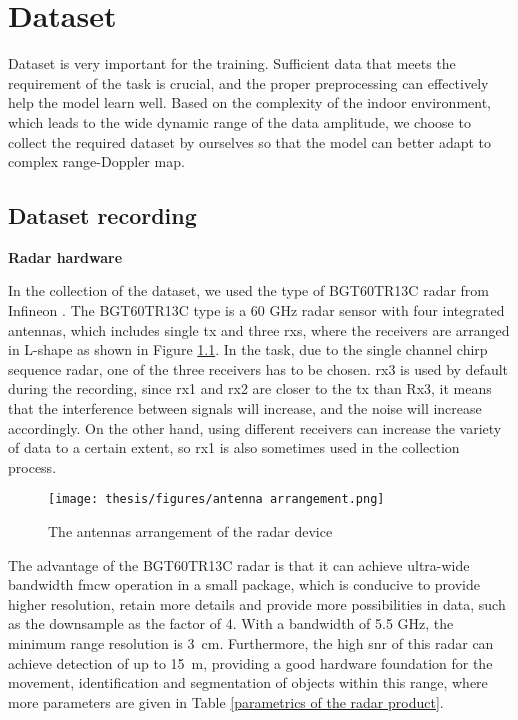 \chapter{Dataset} \label{dataset}
Dataset is very important for the training. Sufficient data that meets the requirement of the task is crucial, and the proper preprocessing can effectively help the model learn well. Based on the complexity of the indoor environment, which leads to the wide dynamic range of the data amplitude, we choose to collect the required dataset by ourselves so that the model can better adapt to complex range-Doppler map.

\section{Dataset recording} \label{dataset recording}

\begin{spacing}{1.5}
\textbf{\large{Radar hardware}}
\end{spacing}

In the collection of the dataset, we used the type of BGT60TR13C radar from Infineon \cite{ag_bgt60tr13c_nodate}. The BGT60TR13C type is a 60 GHz radar sensor with four integrated antennas, which includes single \gls{tx} and three \glspl{rx}, where the receivers are arranged in L-shape as shown in Figure \ref{the antenna arrangement of the radar}. In the task, due to the single channel chirp sequence radar, one of the three receivers has to be chosen. \gls{rx}3 is used by default during the recording, since \gls{rx}1 and \gls{rx}2 are closer to the \gls{tx} than Rx3, it means that the interference between signals will increase, and the noise will increase accordingly. On the other hand, using different receivers can increase the variety of data to a certain extent, so \gls{rx}1 is also sometimes used in the collection process.

\begin{figure}
	\centering
	\texttt{[image: thesis/figures/antenna arrangement.png]}
	\caption{The antennas arrangement of the radar device \cite{ag_bgt60tr13c_nodate}}
	\label{the antenna arrangement of the radar}
\end{figure}

The advantage of the BGT60TR13C radar is that it can achieve ultra-wide bandwidth \gls{fmcw} operation in a small package, which is conducive to provide higher resolution, retain more details and provide more possibilities in data, such as the downsample as the factor of 4. With a bandwidth of 5.5 GHz, the minimum range resolution is \SI{3}{\centi\meter}. Furthermore, the high \gls{snr} of this radar can achieve detection of up to \SI{15}{\meter}, providing a good hardware foundation for the movement, identification and segmentation of objects within this range, where more parameters are given in Table \ref{parametrics of the radar product}.

